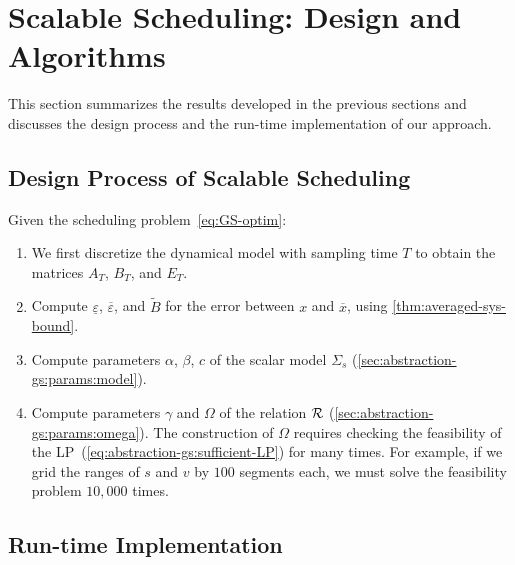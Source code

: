 \section{Scalable Scheduling: Design and Algorithms}
\label{sec:summary}

This section summarizes the results developed in the previous sections and discusses the design process and the run-time implementation of our approach.

\subsection{Design Process of Scalable Scheduling}
\label{sec:summary:design}

Given the scheduling problem~\eqref{eq:GS-optim}:
\begin{enumerate}
\item We first discretize the dynamical model with sampling time $T$
  to obtain the matrices $A_{T}$, $B_{T}$, and $E_{T}$.
\item Compute $\underline{\varepsilon}$, $\overbar{\varepsilon}$, and $\tilde{B}$ for the error between $x$ and $\overbar{x}$, using \cref{thm:averaged-sys-bound}.
\item Compute parameters $\alpha$, $\beta$, $c$ of the scalar model $\Sigma_{s}$ (\cref{sec:abstraction-gs:params:model}).
\item Compute parameters $\gamma$ and $\Omega$ of the relation $\mathcal{R}$ (\cref{sec:abstraction-gs:params:omega}).  The construction of $\Omega$ requires checking the feasibility of the LP~(\ref{eq:abstraction-gs:sufficient-LP}) for many times.  For example, if we grid the ranges of $s$ and $v$ by $100$ segments each, we must solve the feasibility problem $10 \comma 000$ times.  
\end{enumerate}
\subsection{Run-time Implementation}
\label{sec:summary:implementation}




